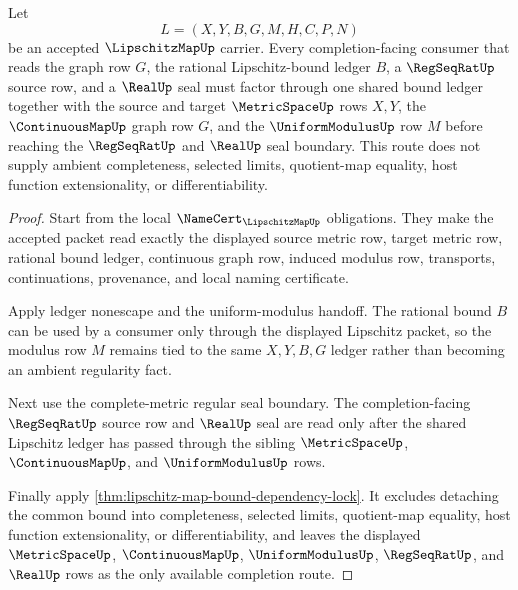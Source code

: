 \begin{theorem}
\label{thm:lipschitz-map-common-bound-completion-route}
Let
$$
L=(X,Y,B,G,M,H,C,P,N)
$$
be an accepted $\LipschitzMapUp$ carrier. Every completion-facing consumer that reads the graph row $G$, the rational Lipschitz-bound ledger $B$, a $\RegSeqRatUp$ source row, and a $\RealUp$ seal must factor through one shared bound ledger together with the source and target $\MetricSpaceUp$ rows $X,Y$, the $\ContinuousMapUp$ graph row $G$, and the $\UniformModulusUp$ row $M$ before reaching the $\RegSeqRatUp$ and $\RealUp$ seal boundary. This route does not supply ambient completeness, selected limits, quotient-map equality, host function extensionality, or differentiability.
\end{theorem}
\begin{proof}
Start from the local $\NameCert_{\LipschitzMapUp}$ obligations. They make the accepted packet read exactly the displayed source metric row, target metric row, rational bound ledger, continuous graph row, induced modulus row, transports, continuations, provenance, and local naming certificate.

Apply ledger nonescape and the uniform-modulus handoff. The rational bound $B$ can be used by a consumer only through the displayed Lipschitz packet, so the modulus row $M$ remains tied to the same $X,Y,B,G$ ledger rather than becoming an ambient regularity fact.

Next use the complete-metric regular seal boundary. The completion-facing $\RegSeqRatUp$ source row and $\RealUp$ seal are read only after the shared Lipschitz ledger has passed through the sibling $\MetricSpaceUp$, $\ContinuousMapUp$, and $\UniformModulusUp$ rows.

Finally apply \autoref{thm:lipschitz-map-bound-dependency-lock}. It excludes detaching the common bound into completeness, selected limits, quotient-map equality, host function extensionality, or differentiability, and leaves the displayed $\MetricSpaceUp$, $\ContinuousMapUp$, $\UniformModulusUp$, $\RegSeqRatUp$, and $\RealUp$ rows as the only available completion route.
\end{proof}

